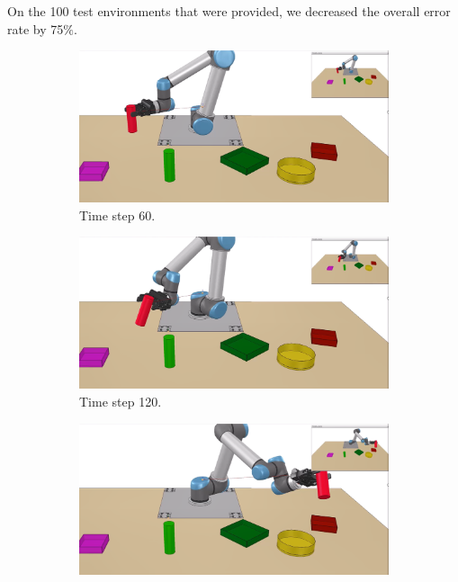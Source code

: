 On the 100 test environments that were provided, we decreased the overall error rate by 75$ \% $. 
\begin{figure}
    \captionsetup[subfigure]{justification=Centering, labelformat=empty}
    \begin{subfigure}[t]{0.18\textwidth}
        \includegraphics[width=\textwidth]{images/Language_Conditioned_Exp/theirs_1.png}
        \caption{Time step 60.}
    \end{subfigure}
    \begin{subfigure}[t]{0.18\textwidth}
        \includegraphics[width=\linewidth]{images/Language_Conditioned_Exp/theirs_2.png}
        \caption{Time step 120.}
    \end{subfigure}
    \begin{subfigure}[t]{0.18\textwidth}
        \includegraphics[width=\linewidth]{images/Language_Conditioned_Exp/theirs_3.png}

\end{subfigure}
\end{figure}
